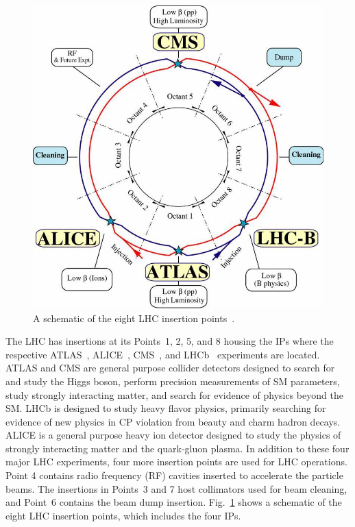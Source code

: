 \begin{figure}[!htb]
	\centering
	\includegraphics[scale=0.40]{figures/lhc-interaction-points}
	\caption{A schematic of the eight LHC insertion points~\cite{LHC_schematic}.}
	\label{lhc-ips}
\end{figure}

The LHC has insertions at its Points~1, 2, 5, and 8 housing the IPs where the respective ATLAS~\cite{Aad:2008zzm}, ALICE~\cite{Aamodt:2008zz}, CMS~\cite{Chatrchyan:2008aa}, and LHCb~\cite{Alves:2008zz} experiments are located. ATLAS and CMS are general purpose collider detectors designed to search for and study the Higgs boson, perform precision measurements of SM parameters, study strongly interacting matter, and search for evidence of physics beyond the SM. LHCb is designed to study heavy flavor physics, primarily searching for evidence of new physics in CP violation from beauty and charm hadron decays. ALICE is a general purpose heavy ion detector designed to study the physics of strongly interacting matter and the quark-gluon plasma. In addition to these four major LHC experiments, four more insertion points are used for LHC operations. Point 4 contains radio frequency (RF) cavities inserted to accelerate the particle beams. The insertions in Points~3 and 7 host collimators used for beam cleaning, and Point~6 contains the beam dump insertion. Fig.~\ref{lhc-ips} shows a schematic of the eight LHC insertion points, which includes the four IPs.


